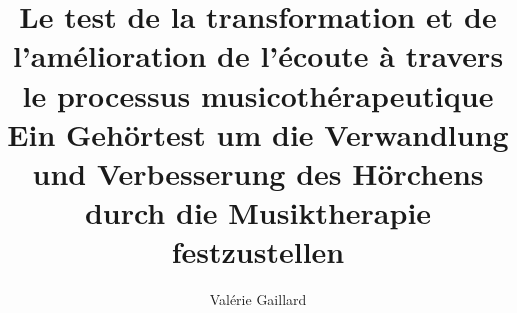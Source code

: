 \documentclass[12pt,pagesize, DIV=10, oneside, headsepline,
titlepage,parskip, headings=small, listof=totoc, 
bibliography=totoc,index=totoc, captions=tableheading, final]{scrreprt}
\title{Le test de la transformation et de l'amélioration de l'écoute à travers le
  processus musicothérapeutique\\
Ein Gehörtest um die Verwandlung und Verbesserung des Hörchens durch
die Musiktherapie festzustellen}
\author{Valérie Gaillard}
\begin{document}

\tableofcontents
%

 
% 
%


 

\appendix

\printglossaries
\label{bibliographie}
\printbibliography
\end{document}
